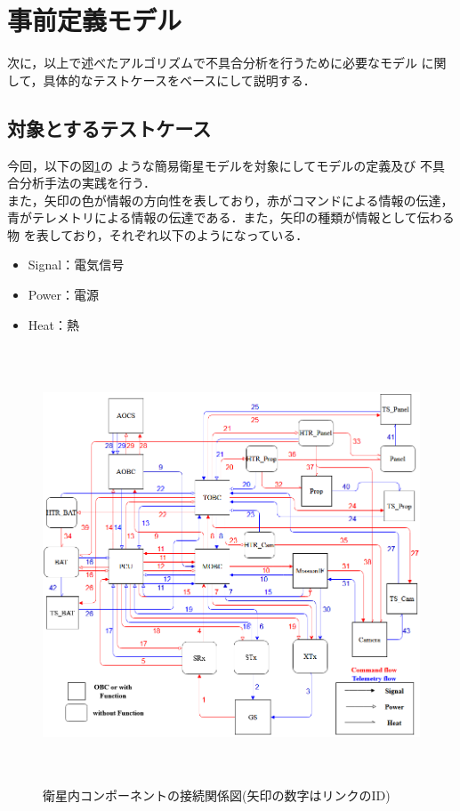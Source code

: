 \documentclass[11pt]{jsreport}
\begin{document}


\section{事前定義モデル}
次に，以上で述べたアルゴリズムで不具合分析を行うために必要なモデル
に関して，具体的なテストケースをベースにして説明する．%

\subsection{対象とするテストケース}
今回，以下の図\ref{fig:simple_sat}の
ような簡易衛星モデルを対象にしてモデルの定義及び
不具合分析手法の実践を行う．\\
また，矢印の色が情報の方向性を表しており，赤がコマンドによる情報の伝達，
青がテレメトリによる情報の伝達である．また，矢印の種類が情報として伝わる物
を表しており，それぞれ以下のようになっている．
\begin{itemize}
   \item Signal：電気信号
   \item Power：電源
   \item Heat：熱
\end{itemize}
\begin{figure}[H]
   \centering
      \includegraphics[height=13.0cm]{figure/satellite_diagram.png}
      \caption{衛星内コンポーネントの接続関係図(矢印の数字はリンクのID)}
      \label{fig:simple_sat}
\end{figure}
\end{document}

